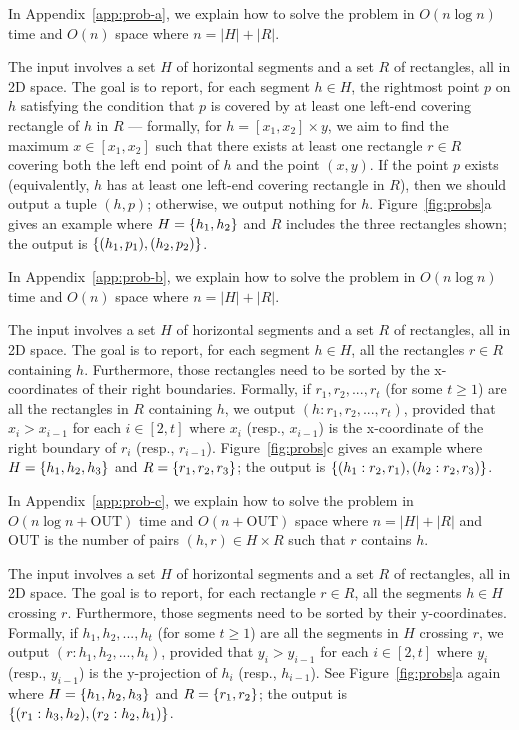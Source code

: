 \documentclass[sigconf]{acmart}
\def\vgap{\vspace{1mm}}
\def\extraspacing{\vspace{2mm} \noindent}
\def\out{\mathrm{OUT}}
\begin{document}
\vgap

In Appendix~\ref{app:prob-a}, we explain how to solve the problem in $O(n \log n)$ time and $O(n)$ space where $n = |H| + |R|$.

\extraspacing {\bf Problem $\bm{\EuScript{B}}$.} The input involves a set $H$ of horizontal segments and a set $R$ of rectangles, all in 2D space. The goal is to report, for each segment $h \in H$, the rightmost point $p$ on $h$ satisfying the condition that $p$ is covered by at least one left-end covering rectangle of $h$ in $R$ --- formally, for $h = [x_1, x_2] \times y$, we aim to find the maximum $x \in [x_1, x_2]$ such that there exists at least one rectangle $r \in R$ covering both the left end point of $h$ and the point $(x, y)$. If the point $p$ exists (equivalently, $h$ has at least one left-end covering rectangle in $R$), then we should output a tuple $(h, p)$; otherwise, we output nothing for $h$. Figure~\ref{fig:probs}a gives an example where $H = \{h_1, h_2\}$ and $R$ includes the three rectangles shown; the output is $\{(h_1, p_1), (h_2, p_2)\}$.

\vgap

In Appendix~\ref{app:prob-b}, we explain how to solve the problem in $O(n \log n)$ time and $O(n)$ space where $n = |H| + |R|$.

\extraspacing {\bf Problem $\bm{\EuScript{C}}$.} The input involves a set $H$ of horizontal segments and a set $R$ of rectangles, all in 2D space. The goal is to report, for each segment $h \in H$, all the rectangles $r \in R$ containing $h$. Furthermore, those rectangles need to be sorted by the x-coordinates of their right boundaries. Formally, if $r_1, r_2, ..., r_t$ (for some $t \ge 1$) are all the rectangles in $R$ containing $h$, we output $(h: r_1, r_2, ..., r_t)$, provided that $x_i > x_{i-1}$ for each $i \in [2, t]$ where $x_i$ (resp., $x_{i-1}$) is the x-coordinate of the right boundary of $r_i$ (resp., $r_{i-1}$). Figure~\ref{fig:probs}c gives an example where $H = \{h_1, h_2, h_3\}$ and $R = \{r_1, r_2, r_3\}$; the output is $\{(h_1: r_2, r_1), (h_2: r_2, r_3)\}$.

\vgap

In Appendix~\ref{app:prob-c}, we explain how to solve the problem in $O(n \log n + \out)$ time and $O(n + \out)$ space where $n = |H| + |R|$ and $\out$ is the number of pairs $(h, r) \in H \times R$ such that $r$ contains $h$.

\extraspacing {\bf Problem $\bm{\EuScript{D}}$.} The input involves a set $H$ of horizontal segments and a set $R$ of rectangles, all in 2D space. The goal is to report, for each rectangle $r \in R$, all the segments $h \in H$ crossing $r$. Furthermore, those segments need to be sorted by their y-coordinates. Formally, if $h_1, h_2, ..., h_t$ (for some $t \ge 1$) are all the segments in $H$ crossing $r$, we output $(r: h_1, h_2, ..., h_t)$, provided that $y_i > y_{i-1}$ for each $i \in [2, t]$ where $y_i$ (resp., $y_{i-1}$) is the y-projection of $h_i$ (resp., $h_{i-1}$). See Figure~\ref{fig:probs}a again where $H = \{h_1, h_2, h_3\}$ and $R = \{r_1, r_2\}$; the output is $\{(r_1: h_3, h_2), (r_2: h_2, h_1)\}$.
\end{document}
